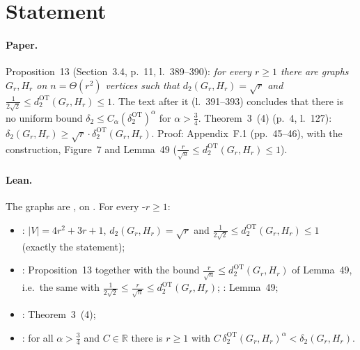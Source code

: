 

\paperversion

\section{Statement}

\paragraph{Paper.} Proposition~13 (Section~3.4, p.~11, l.~389--390): \emph{for every $r\ge1$ there are graphs
$G_r,H_r$ on $n=\Theta(r^2)$ vertices such that $d_2(G_r,H_r)=\sqrt r$ and
$\frac1{2\sqrt2}\le d^{\mathrm{OT}}_2(G_r,H_r)\le1$.} The text after it (l.~391--393) concludes that there is no
uniform bound $\delta_2\le C_\alpha(\delta^{\mathrm{OT}}_2)^\alpha$ for $\alpha>\frac34$. Theorem~3~(4) (p.~4,
l.~127): $\delta_2(G_r,H_r)\ge\sqrt r\cdot\delta^{\mathrm{OT}}_2(G_r,H_r)$. Proof: Appendix~F.1 (pp.~45--46), with the
construction, Figure~7 and Lemma~49 ($\frac r{\sqrt n}\le d^{\mathrm{OT}}_2(G_r,H_r)\le1$).

\paragraph{Lean.} The graphs are ,  on . For every
\hyp{$r\ge1$}:
\begin{itemize}
\item {}: $|V|=4r^2+3r+1$, $d_2(G_r,H_r)=\sqrt r$ and $\frac1{2\sqrt2}\le d^{\mathrm{OT}}_2(G_r,H_r)\le1$
  (exactly the statement);
\item {}: Proposition~13 together with the bound $\frac r{\sqrt n}\le d^{\mathrm{OT}}_2(G_r,H_r)$
  of Lemma~49, i.e.\ the same with $\frac1{2\sqrt2}\le\frac r{\sqrt n}\le d^{\mathrm{OT}}_2(G_r,H_r)$;
  : Lemma~49;
\item {}: Theorem~3~(4);
\item {}: for all $\alpha>\frac34$ and $C\in\mathbb R$ there is $r\ge1$ with
  $C\,\delta^{\mathrm{OT}}_2(G_r,H_r)^\alpha<\delta_2(G_r,H_r)$.
\end{itemize}

